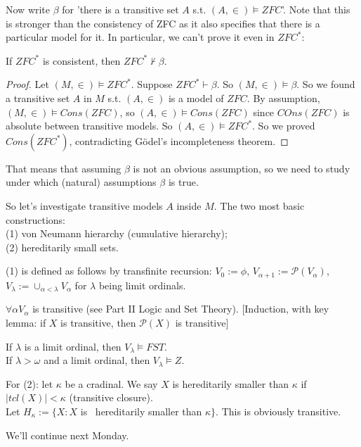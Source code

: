 \documentclass[a4paper]{article}
\begin{document}
Now write $\beta$ for 'there is a transitive set $A$ s.t. $(A,\in) \vDash ZFC$'. Note that this is stronger than the consistency of ZFC as it also specifies that there is a particular model for it. In particular, we can't prove it even in $ZFC^*$:

\begin{thm}
If $ZFC^*$ is consistent, then $ZFC^* \not\vdash \beta$.
\begin{proof}
Let $(M,\in) \vDash ZFC^*$. Suppose $ZFC^* \vdash \beta$. So $(M,\in) \vDash \beta$. So we found a transitive set $A$ in $M$ s.t. $(A,\in)$ is a model of $ZFC$. By assumption, $(M,\in) \vDash Cons(ZFC)$, so $(A,\in) \vDash Cons(ZFC)$ since $COns(ZFC)$ is absolute between transitive models. So $(A,\in) \vDash ZFC^*$. So we proved $Cons(ZFC^*)$, contradicting G\"{o}del's incompleteness theorem.
\end{proof}
\end{thm}

That means that assuming $\beta$ is not an obvious assumption, so we need to study under which (natural) assumptions $\beta$ is true.

So let's investigate transitive models $A$ inside $M$. The two most basic constructions: \\
(1) von Neumann hierarchy (cumulative hierarchy);\\
(2) hereditarily small sets.

(1) is defined as follows by transfinite recursion: $V_0:=\phi$, $V_{\alpha+1} := \mathcal{P}(V_\alpha)$, $V_\lambda := \cup_{\alpha<\lambda} V_\alpha$ for $\lambda$ being limit ordinals.

\begin{prop}
$\forall \alpha V_\alpha$ is transitive (see Part II Logic and Set Theory). [Induction, with key lemma: if $X$ is transitive, then $\mathcal{P}(X)$ is transitive]
\end{prop}

If $\lambda$ is a limit ordinal, then $V_\lambda \vDash FST$.\\
If $\lambda > \omega$ and a limit ordinal, then $V_\lambda \vDash Z$.

For (2): let $\kappa$ be a cradinal. We say $X$ is hereditarily smaller than $\kappa$ if $|tcl(X)| < \kappa$ (transitive closure).\\
Let $H_\kappa := \{X:X$ is 	~hereditarily smaller than $\kappa\}$. This is obviously transitive.

We'll continue next Monday.
\end{document}
